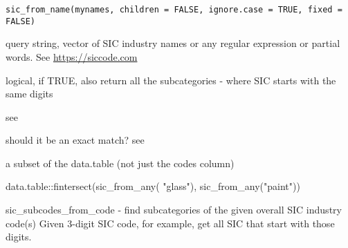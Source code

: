 \documentclass[a4paper]{book}
\begin{document}
%
\begin{Usage}
\begin{verbatim}
sic_from_name(mynames, children = FALSE, ignore.case = TRUE, fixed = FALSE)
\end{verbatim}
\end{Usage}
%
\begin{Arguments}
\begin{ldescription}
\item[\code{mynames}] query string, vector of SIC industry names or any regular expression or partial words. See \url{https://siccode.com}

\item[\code{children}] logical, if TRUE, also return all the subcategories - where SIC starts with the same digits

\item[\code{ignore.case}] see 

\item[\code{fixed}] should it be an exact match? see 
\end{ldescription}
\end{Arguments}
%
\begin{Value}
a subset of the  data.table (not just the codes column)
\end{Value}
%
\begin{SeeAlso}\relax
{}     
\end{SeeAlso}
%
\begin{Examples}
\begin{ExampleCode}
 data.table::fintersect(sic_from_any( "glass"), sic_from_any("paint"))
\end{ExampleCode}
\end{Examples}
%
\begin{Description}\relax
sic\_subcodes\_from\_code - find subcategories of the given overall SIC industry code(s)
Given 3-digit SIC code, for example, get all SIC that start with those digits.
\end{Description}
\end{document}
